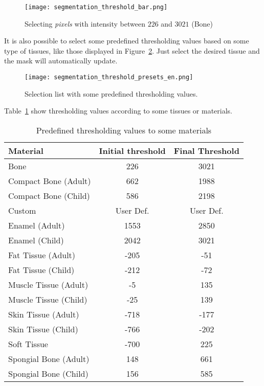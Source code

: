 \begin{figure}[!htb]
\centering
\texttt{[image: segmentation\_threshold\_bar.png]}
\caption{Selecting \textit{pixels} with intensity between $226$ and $3021$ (Bone)}
\label{fig:region_selection_bar}
\end{figure}

It is also possible to select some predefined thresholding values based on some type of tissues, like those displayed in Figure~\ref{fig:limiar_presets}. Just select the desired tissue and the mask will automatically update.

\begin{figure}[!htb]
\centering
\texttt{[image: segmentation\_threshold\_presets\_en.png]}
\caption{Selection list with some predefined thresholding values.}
\label{fig:limiar_presets}
\end{figure}

Table~\ref{tab:limiar} show thresholding values according to some tissues or materials.

\begin{table}[h]
\centering
\caption{Predefined thresholding values to some materials}
\begin{tabular}{lcc}\\
\hline %
Material & Initial threshold & Final Threshold\\
\hline
\hline
Bone & 226 & 3021\\
Compact Bone (Adult) & 662 & 1988\\
Compact Bone (Child) & 586 & 2198\\
Custom & User Def. & User Def.\\
Enamel (Adult) & 1553 & 2850\\
Enamel (Child) & 2042 & 3021\\
Fat Tissue (Adult) & -205 & -51\\
Fat Tissue (Child) & -212 & -72\\
Muscle Tissue (Adult) & -5 & 135\\
Muscle Tissue (Child) & -25 & 139\\
Skin Tissue (Adult) & -718 & -177\\
Skin Tissue (Child) & -766 & -202\\
Soft Tissue & -700 & 225\\
Spongial Bone (Adult) & 148 & 661\\
Spongial Bone (Child) & 156 & 585\\
\hline
\end{tabular}
\label{tab:limiar}
\end{table}
\newpage

